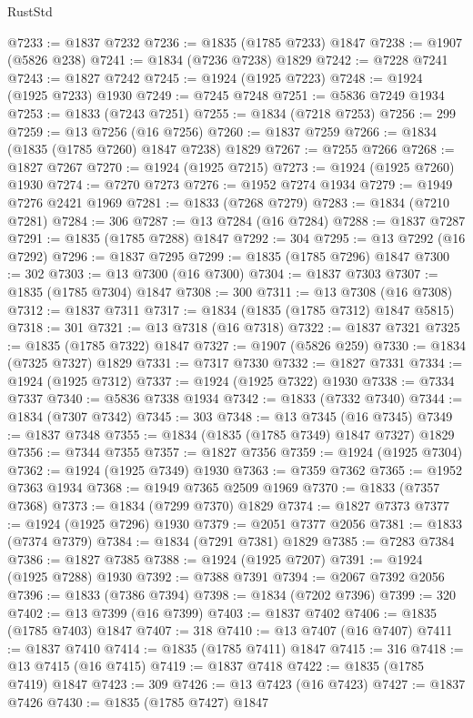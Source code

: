 \begin{lexlean}{RustStd}
\begin{coremodule}
{\begin{coremodule}
{{{{{@7233 := @1837 @7232
@7236 := @1835 (@1785 @7233) @1847
@7238 := @1907 (@5826 @238)
@7241 := @1834 (@7236 @7238) @1829
@7242 := @7228 @7241
@7243 := @1827 @7242
@7245 := @1924 (@1925 @7223)
@7248 := @1924 (@1925 @7233) @1930
@7249 := @7245 @7248
@7251 := @5836 @7249 @1934
@7253 := @1833 (@7243 @7251)
@7255 := @1834 (@7218 @7253)
@7256 := 299
@7259 := @13 @7256 (@16 @7256)
@7260 := @1837 @7259
@7266 := @1834 (@1835 (@1785 @7260) @1847 @7238) @1829
@7267 := @7255 @7266
@7268 := @1827 @7267
@7270 := @1924 (@1925 @7215)
@7273 := @1924 (@1925 @7260) @1930
@7274 := @7270 @7273
@7276 := @1952 @7274 @1934
@7279 := @1949 @7276 @2421 @1969
@7281 := @1833 (@7268 @7279)
@7283 := @1834 (@7210 @7281)
@7284 := 306
@7287 := @13 @7284 (@16 @7284)
@7288 := @1837 @7287
@7291 := @1835 (@1785 @7288) @1847
@7292 := 304
@7295 := @13 @7292 (@16 @7292)
@7296 := @1837 @7295
@7299 := @1835 (@1785 @7296) @1847
@7300 := 302
@7303 := @13 @7300 (@16 @7300)
@7304 := @1837 @7303
@7307 := @1835 (@1785 @7304) @1847
@7308 := 300
@7311 := @13 @7308 (@16 @7308)
@7312 := @1837 @7311
@7317 := @1834 (@1835 (@1785 @7312) @1847 @5815)
@7318 := 301
@7321 := @13 @7318 (@16 @7318)
@7322 := @1837 @7321
@7325 := @1835 (@1785 @7322) @1847
@7327 := @1907 (@5826 @259)
@7330 := @1834 (@7325 @7327) @1829
@7331 := @7317 @7330
@7332 := @1827 @7331
@7334 := @1924 (@1925 @7312)
@7337 := @1924 (@1925 @7322) @1930
@7338 := @7334 @7337
@7340 := @5836 @7338 @1934
@7342 := @1833 (@7332 @7340)
@7344 := @1834 (@7307 @7342)
@7345 := 303
@7348 := @13 @7345 (@16 @7345)
@7349 := @1837 @7348
@7355 := @1834 (@1835 (@1785 @7349) @1847 @7327) @1829
@7356 := @7344 @7355
@7357 := @1827 @7356
@7359 := @1924 (@1925 @7304)
@7362 := @1924 (@1925 @7349) @1930
@7363 := @7359 @7362
@7365 := @1952 @7363 @1934
@7368 := @1949 @7365 @2509 @1969
@7370 := @1833 (@7357 @7368)
@7373 := @1834 (@7299 @7370) @1829
@7374 := @1827 @7373
@7377 := @1924 (@1925 @7296) @1930
@7379 := @2051 @7377 @2056
@7381 := @1833 (@7374 @7379)
@7384 := @1834 (@7291 @7381) @1829
@7385 := @7283 @7384
@7386 := @1827 @7385
@7388 := @1924 (@1925 @7207)
@7391 := @1924 (@1925 @7288) @1930
@7392 := @7388 @7391
@7394 := @2067 @7392 @2056
@7396 := @1833 (@7386 @7394)
@7398 := @1834 (@7202 @7396)
@7399 := 320
@7402 := @13 @7399 (@16 @7399)
@7403 := @1837 @7402
@7406 := @1835 (@1785 @7403) @1847
@7407 := 318
@7410 := @13 @7407 (@16 @7407)
@7411 := @1837 @7410
@7414 := @1835 (@1785 @7411) @1847
@7415 := 316
@7418 := @13 @7415 (@16 @7415)
@7419 := @1837 @7418
@7422 := @1835 (@1785 @7419) @1847
@7423 := 309
@7426 := @13 @7423 (@16 @7423)
@7427 := @1837 @7426
@7430 := @1835 (@1785 @7427) @1847
}}}}}
\end{coremodule}}
\end{coremodule}
\end{lexlean}
